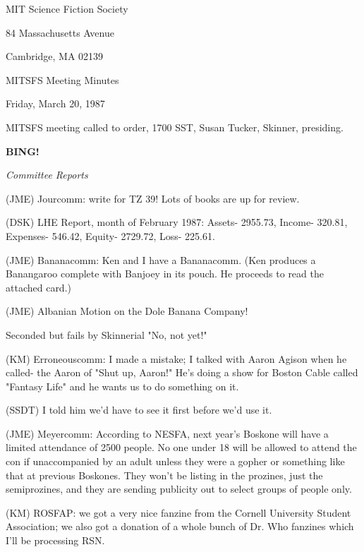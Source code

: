 \documentclass[12pt]{article}
\newcommand{\bing}{{\bf BING!} }
\newcommand{\goto}[1]{\bing \vskip 12pt \centerline{{\em{#1}}}}
\begin{document}
\begin{center}

MIT Science Fiction Society 

84 Massachusetts Avenue

Cambridge, MA 02139

\vspace{12pt}

MITSFS Meeting Minutes 

Friday, March 20, 1987

\end{center}
 
\vspace{18pt}

\setlength{\parskip}{6pt}

\noindent
MITSFS meeting called to order, 1700 SST,
Susan Tucker, Skinner, presiding.

\goto{Committee Reports}

(JME) Jourcomm: write for TZ 39! Lots of books are up for review.

(DSK) LHE Report, month of February 1987: Assets- 2955.73, Income- 320.81, Expenses- 546.42, Equity- 2729.72, Loss- 225.61.

(JME) Bananacomm: Ken and I have a Bananacomm. (Ken produces a Banangaroo complete with Banjoey in its pouch. He proceeds to read the attached card.)

(JME) Albanian Motion on the Dole Banana Company!

Seconded but fails by Skinnerial "No, not yet!"

(KM) Erroneouscomm: I made a mistake; I talked with Aaron Agison when he called- the Aaron of "Shut up, Aaron!" He's doing a show for Boston Cable called "Fantasy Life" and he wants us to do something on it.

(SSDT) I told him we'd have to see it first before we'd use it.

(JME) Meyercomm: According to NESFA, next year's Boskone will have a limited attendance of 2500 people. No one under 18 will be allowed to attend the con if unaccompanied by an adult unless they were a gopher or something like that at previous Boskones. They won't be listing in the prozines, just the semiprozines, and they are sending publicity out to select groups of people only.

(KM) ROSFAP: we got a very nice fanzine from the Cornell University Student Association; we also got a donation of a whole bunch of Dr. Who fanzines which I'll be processing RSN.
\end{document}

